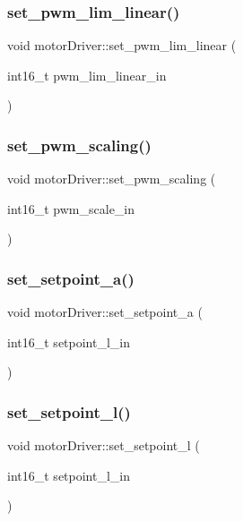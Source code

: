 \subsubsection{\texorpdfstring{set\_pwm\_lim\_linear()}{set\_pwm\_lim\_linear()}}
{\footnotesize\ttfamily void motor\+Driver\+::set\+\_\+pwm\+\_\+lim\+\_\+linear (\begin{DoxyParamCaption}\item[{int16\+\_\+t}]{pwm\+\_\+lim\+\_\+linear\+\_\+in }\end{DoxyParamCaption})}

\mbox{\label{classmotorDriver_ad226c2718cab94496bf293434902d8ac}} 
\subsubsection{\texorpdfstring{set\_pwm\_scaling()}{set\_pwm\_scaling()}}
{\footnotesize\ttfamily void motor\+Driver\+::set\+\_\+pwm\+\_\+scaling (\begin{DoxyParamCaption}\item[{int16\+\_\+t}]{pwm\+\_\+scale\+\_\+in }\end{DoxyParamCaption})}

\mbox{\label{classmotorDriver_a6e71895792955acca1ed81eca952d767}} 
\subsubsection{\texorpdfstring{set\_setpoint\_a()}{set\_setpoint\_a()}}
{\footnotesize\ttfamily void motor\+Driver\+::set\+\_\+setpoint\+\_\+a (\begin{DoxyParamCaption}\item[{int16\+\_\+t}]{setpoint\+\_\+l\+\_\+in }\end{DoxyParamCaption})}

\mbox{\label{classmotorDriver_a574c77f9c8b357f0fba8f1d477660c8c}} 
\subsubsection{\texorpdfstring{set\_setpoint\_l()}{set\_setpoint\_l()}}
{\footnotesize\ttfamily void motor\+Driver\+::set\+\_\+setpoint\+\_\+l (\begin{DoxyParamCaption}\item[{int16\+\_\+t}]{setpoint\+\_\+l\+\_\+in }\end{DoxyParamCaption})}

